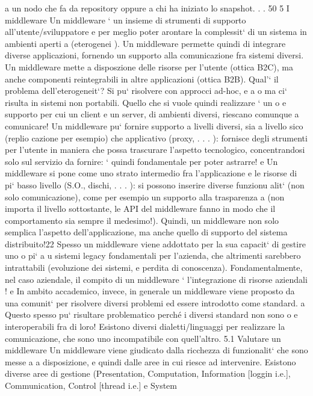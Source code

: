 \documentclass[a4paper,12pt]{article}
\begin{document}
a un nodo che fa da repository oppure a chi ha iniziato lo snapshot. . .
50
5
I middleware
Un middleware ` un insieme di strumenti di supporto all'utente/sviluppatore
e
per meglio poter arontare la complessit` di un sistema in ambienti aperti
a
(eterogenei ). Un middleware permette quindi di integrare diverse applicazioni,
fornendo un supporto alla comunicazione fra sistemi diversi.
Un middleware mette a disposzione delle risorse per l'utente (ottica B2C),
ma anche componenti reintegrabili in altre applicazioni (ottica B2B).
Qual'` il problema dell'eterogeneit`? Si pu` risolvere con approcci ad-hoc,
e
a
o
ma ci` risulta in sistemi non portabili. Quello che si vuole quindi realizzare ` un
o
e
supporto per cui un client e un server, di ambienti diversi, riescano comunque
a comunicare!
Un middleware pu` fornire supporto a livelli diversi, sia a livello sico (replio
cazione per esempio) che applicativo (proxy, . . . ): fornisce degli strumenti per
l'utente in maniera che possa trascurare l'aspetto tecnologico, concentrandosi
solo sul servizio da fornire: ` quindi fondamentale per poter astrarre!
e
Un middleware si pone come uno strato intermedio fra l'applicazione e le
risorse di pi` basso livello (S.O., dischi, . . . ): si possono inserire diverse funzionu
alit` (non solo comunicazione), come per esempio un supporto alla trasparenza
a
(non importa il livello sottostante, le API del middleware fanno in modo che
il comportamento sia sempre il medesimo!). Quindi, un middleware non solo
semplica l'aspetto dell'applicazione, ma anche quello di supporto del sistema
distribuito!22
Spesso un middleware viene addottato per la sua capacit` di gestire uno o pi`
a
u
sistemi legacy fondamentali per l'azienda, che altrimenti sarebbero intrattabili
(evoluzione dei sistemi, e perdita di conoscenza). Fondamentalmente, nel caso
aziendale, il compito di un middleware ` l'integrazione di risorse aziendali !
e
In ambito accademico, invece, in generale un middleware viene proposto da
una comunit` per risolvere diversi problemi ed essere introdotto come standard.
a
Questo spesso pu` risultare problematico perché i diversi standard non sono
o
e
interoperabili fra di loro! Esistono diversi dialetti/linguaggi per realizzare la
comunicazione, che sono uno incompatibile con quell'altro.
5.1
Valutare un middleware
Un middleware viene giudicato dalla ricchezza di funzionalit` che sono messe a
a
disposizione, e quindi dalle aree in cui riesce ad intervenire. Esistono diverse
aree di gestione (Presentation, Computation, Information [loggin i.e.], Communication, Control [thread i.e.] e System
\end{document}
